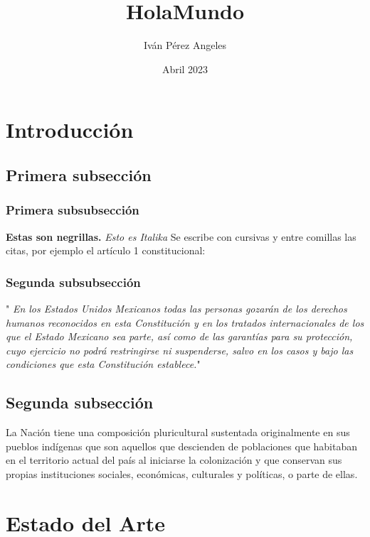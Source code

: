\documentclass{article}
\title{HolaMundo}
\author{Iván Pérez Angeles}
\date{Abril 2023}
\begin{document}
\maketitle

\section{Introducción}
\subsection{Primera subsección}
\subsubsection{Primera subsubsección}

\textbf{Estas son negrillas.} \textit{Esto es Italika}
Se escribe con cursivas y entre comillas las citas, por ejemplo el artículo 1 constitucional:
\subsubsection{Segunda subsubsección}
"\textit{ En los Estados Unidos Mexicanos todas las personas gozarán de los derechos humanos
reconocidos en esta Constitución y en los tratados internacionales de los que el Estado Mexicano sea
parte, así como de las garantías para su protección, cuyo ejercicio no podrá restringirse ni suspenderse,
salvo en los casos y bajo las condiciones que esta Constitución establece.}"
\subsection{Segunda subsección}
La Nación tiene una composición pluricultural sustentada originalmente en sus pueblos indígenas que
son aquellos que descienden de poblaciones que habitaban en el territorio actual del país al iniciarse la
colonización y que conservan sus propias instituciones sociales, económicas, culturales y políticas, o
parte de ellas.


\section{Estado del Arte}
\end{document}
